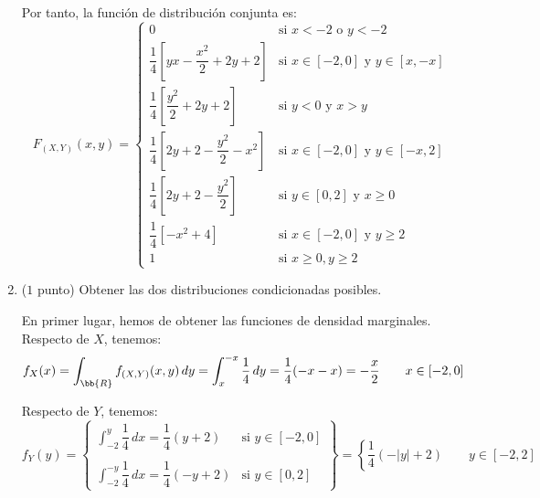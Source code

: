 \documentclass[12pt]{article}
\begin{document}
\begin{ejercicio}
\begin{enumerate}
            Por tanto, la función de distribución conjunta es:
            \begin{equation*}
                F_{(X,Y)}(x, y) = \begin{cases}
                    0 & \text{si } x < -2 \text{ o } y < -2\\
                    \dfrac{1}{4}\left[yx - \dfrac{x^2}{2} + 2y+2\right] & \text{si } x\in [-2, 0] \text{ y } y\in [x, -x]\\
                    \dfrac{1}{4}\left[\dfrac{y^2}{2} + 2y + 2\right] & \text{si } y<0 \text{ y } x > y\\
                    \dfrac{1}{4}\left[2y + 2 - \dfrac{y^2}{2} - x^2\right] & \text{si } x\in [-2, 0] \text{ y } y\in [-x, 2]\\
                    \dfrac{1}{4}\left[2y + 2 - \dfrac{y^2}{2}\right] & \text{si } y\in [0, 2] \text{ y } x \geq 0\\
                    \dfrac{1}{4}\left[-x^2 + 4\right] & \text{si } x\in [-2, 0] \text{ y } y\geq 2\\
                    1 & \text{si } x\geq 0, y\geq 2
                \end{cases}
            \end{equation*}
            \item ($1$ punto) Obtener las dos distribuciones condicionadas posibles.
            
            En primer lugar, hemos de obtener las funciones de densidad marginales. Respecto de $X$, tenemos:
            \begin{align*}
                f_X(x) &= \int_{\bb{R}} f_{(X,Y)}(x, y) \, dy = \int_{x}^{-x} \dfrac{1}{4} \, dy = \dfrac{1}{4}(-x-x) = -\dfrac{x}{2} \qquad x\in [-2, 0]\\
            \end{align*}

            Respecto de $Y$, tenemos:
            \begin{equation*}
                f_Y(y) = \left\{\begin{array}{ll}
                    \displaystyle \int_{-2}^{y} \dfrac{1}{4} \, dx = \dfrac{1}{4}(y+2) & \text{si } y\in [-2, 0]\\\\
                    \displaystyle \int_{-2}^{-y} \dfrac{1}{4} \, dx  = \dfrac{1}{4}(-y+2) & \text{si } y\in [0, 2]
                    \end{array}\right\}
                    = \left\{\dfrac{1}{4} (-|y|+2) \qquad y\in [-2, 2]\right.
            \end{equation*}


\end{enumerate}
\end{ejercicio}
\end{document}

